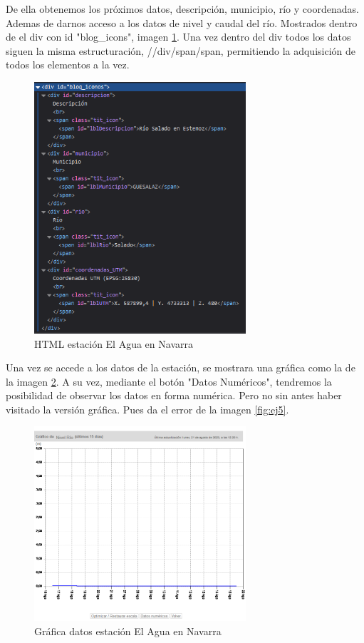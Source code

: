 De ella obtenemos los próximos datos, descripción, municipio, río y coordenadas. Ademas de darnos acceso a los datos de nivel y caudal del río. Mostrados dentro de el div con id "blog\_icons", imagen \ref{fig:ej24}. Una vez dentro del div todos los datos siguen la misma estructuración, //div/span/span, permitiendo la adquisición de todos los elementos a la vez.

\begin{figure} [H]
	\centering
	\includegraphics[width=0.7\textwidth]{fig/AguaEnNavarraEstacionHTML.png}
	\caption[HTML estación de El Agua en Navarra]{HTML estación El Agua en Navarra}
	\label{fig:ej24}
\end{figure}

Una vez se accede a los datos de la estación, se mostrara una gráfica como la de la imagen \ref{fig:ej25}. A su vez, mediante el botón "Datos Numéricos", tendremos la posibilidad de observar los datos en forma numérica. Pero no sin antes haber visitado la versión gráfica. Pues da el error de la imagen \ref{fig:ej5}.

\begin{figure} [H]
	\centering
	\includegraphics[width=0.7\textwidth]{fig/AguaEnNavarraGrafica.png}
	\caption[Gráfica de datos en estación de El Agua en Navarra]{Gráfica datos estación El Agua en Navarra}
	\label{fig:ej25}
\end{figure}

